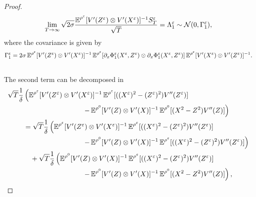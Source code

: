 \documentclass[10pt]{article}
\begin{document}
\begin{proof}
	\begin{equation}
	\lim_{T \to \infty} \sqrt{2\sigma} \frac{\operatorname{\mathbb{E}}^{\rho^\varepsilon} [ V'(Z^\varepsilon) \otimes V'(X^\varepsilon) ]^{-1} S_T^\varepsilon}{\sqrt{T}} = \Lambda_1^\varepsilon \sim \mathcal N(0, \Gamma_1^\varepsilon),
	\end{equation}
	where the covariance is given by
	\begin{equation}
		\Gamma_1^\varepsilon = 2\sigma \operatorname{\mathbb{E}}^{\rho^\varepsilon}[V'(Z^\varepsilon) \otimes V'(X^\varepsilon)]^{-1}\operatorname{\mathbb{E}}^{\rho^\varepsilon}[\partial_x \Phi_1^\varepsilon(X^\varepsilon, Z^\varepsilon) \otimes \partial_x \Phi_1^\varepsilon(X^\varepsilon, Z^\varepsilon)]\operatorname{\mathbb{E}}^{\rho^\varepsilon}[V'(X^\varepsilon) \otimes V'(Z^\varepsilon)]^{-1}.
	\end{equation}
	 \\
	
	 The second term can be decomposed in 
	\begin{equation}
	\begin{aligned}
	\sqrt{T} \frac1\delta & \left( \E^{\rho^\epl} [ V'(Z^\epl) \otimes V'(X^\epl) ]^{-1} \E^{\rho^\epl}[((X^\epl)^2 - (Z^\epl)^2)V''(Z^\epl)] \right. \\
	&\hspace{3cm} \left. - \E^{\rho^0} [ V'(Z) \otimes V'(X) ]^{-1} \E^{\rho^0}[(X^2 - Z^2)V''(Z)] \right) \\
	&= \sqrt{T} \frac1\delta \left( \E^{\rho^\epl} [ V'(Z^\epl) \otimes V'(X^\epl) ]^{-1} \E^{\rho^\epl}[((X^\epl)^2 - (Z^\epl)^2)V''(Z^\epl)] \right. \\
	&\hspace{3cm} \left. - \E^{\rho^0} [ V'(Z) \otimes V'(X) ]^{-1} \E^{\rho^\epl}[((X^\epl)^2 - (Z^\epl)^2)V''(Z^\epl)] \right) \\
	&\quad + \sqrt{T} \frac1\delta \left( \E^{\rho^0} [ V'(Z) \otimes V'(X) ]^{-1} \E^{\rho^\epl}[((X^\epl)^2 - (Z^\epl)^2)V''(Z^\epl)] \right. \\
	&\hspace{3cm} \left. - \E^{\rho^0} [ V'(Z) \otimes V'(X) ]^{-1} \E^{\rho^0}[(X^2 - Z^2)V''(Z)] \right), \\
	\end{aligned}
	\end{equation}
\end{proof}
\end{document}
